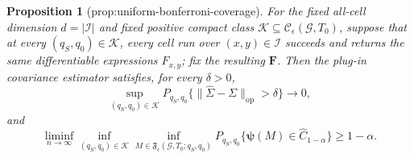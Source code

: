 \documentclass{article}
\newtheorem{proposition}{Proposition}
\begin{document}
\begin{proposition}[prop:uniform-bonferroni-coverage]\label{prop:uniform-bonferroni-coverage}
For the fixed all-cell dimension \(d=\lvert\mathcal I\rvert\) and fixed positive compact class \(\mathcal K\subseteq\mathcal C_{\epsilon}(\mathcal G,T_0)\), suppose that at every \((q_S,q_0)\in\mathcal K\), every cell run over \((x,y)\in\mathcal I\) succeeds and returns the same differentiable expressions \(F_{x,y}\); fix the resulting \(\mathbf F\). Then the plug-in covariance estimator satisfies, for every \(\delta>0\), \[\sup_{(q_S,q_0)\in\mathcal K}P_{q_S,q_0}\{\|\widehat\Sigma-\Sigma\|_{\mathrm{op}}>\delta\}\longrightarrow0,\] and \[\liminf_{n\to\infty}\inf_{(q_S,q_0)\in\mathcal K}\inf_{M\in\mathfrak F_{\epsilon}(\mathcal G,T_0;q_S,q_0)}P_{q_S,q_0}\{\boldsymbol\psi(M)\in\widehat C_{1-\alpha}\}\ge1-\alpha.\]
\end{proposition}
\end{document}
